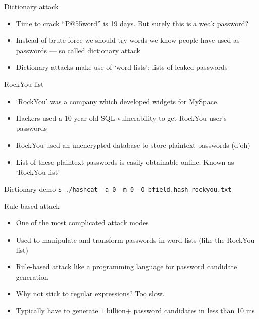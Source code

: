 \documentclass[12pt,aspectratio=169]{beamer}
\begin{document}
\begin{frame}{Dictionary attack}
  \begin{itemize}
    \item Time to crack ``P@55word'' is 19 days. But surely this is a weak password?
    \item Instead of brute force we should try words we know people have used as passwords --- so called dictionary attack
    \item Dictionary attacks make use of `word-lists': lists of leaked passwords
  \end{itemize}
\end{frame}

\begin{frame}{RockYou list}
  \begin{itemize}
    \item `RockYou' was a company which developed widgets for MySpace.
    \item Hackers used a 10-year-old SQL vulnerability to get RockYou user's passwords
    \item RockYou used an unencrypted database to store plaintext passwords (d'oh)
    \item List of these plaintext passwords is easily obtainable online. Known as `RockYou list'
  \end{itemize}
\end{frame}

\begin{frame}{Dictionary demo}
  \lstinline|$ ./hashcat -a 0 -m 0 -O bfield.hash rockyou.txt|
\end{frame}

\begin{frame}{Rule based attack}
  \begin{itemize}
    \item One of the most complicated attack modes
    \item Used to manipulate and transform passwords in word-lists (like the RockYou list)
    \item Rule-based attack like a programming language for password candidate generation
          \vspace{0.5cm}
    \item Why not stick to regular expressions? Too slow.
    \item Typically have to generate $1$ billion$+$ password candidates in less than 10 ms
  \end{itemize}
\end{frame}
\end{document}
